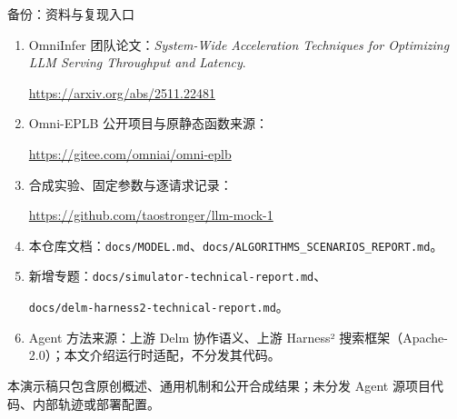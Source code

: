 \documentclass[aspectratio=169,10pt]{beamer}
\newcommand{\src}[1]{\vfill{\fontsize{6.7}{8}\selectfont\color{Muted}#1}\par}
\begin{document}
\begin{frame}{备份：资料与复现入口}
\small
\begin{enumerate}
\item OmniInfer 团队论文：\emph{System-Wide Acceleration Techniques for Optimizing LLM Serving Throughput and Latency}.\par
\url{https://arxiv.org/abs/2511.22481}
\item Omni-EPLB 公开项目与原静态函数来源：\par
\url{https://gitee.com/omniai/omni-eplb}
\item 合成实验、固定参数与逐请求记录：\par
\url{https://github.com/taostronger/llm-mock-1}
\item 本仓库文档：\texttt{docs/MODEL.md}、\texttt{docs/ALGORITHMS\_SCENARIOS\_REPORT.md}。
\item 新增专题：\texttt{docs/simulator-technical-report.md}、\par
\texttt{docs/delm-harness2-technical-report.md}。
\item Agent 方法来源：上游 Delm 协作语义、上游 Harness² 搜索框架（Apache-2.0）；本文介绍运行时适配，不分发其代码。
\end{enumerate}
\src{本演示稿只包含原创概述、通用机制和公开合成结果；未分发 Agent 源项目代码、内部轨迹或部署配置。}
\end{frame}
\end{document}
